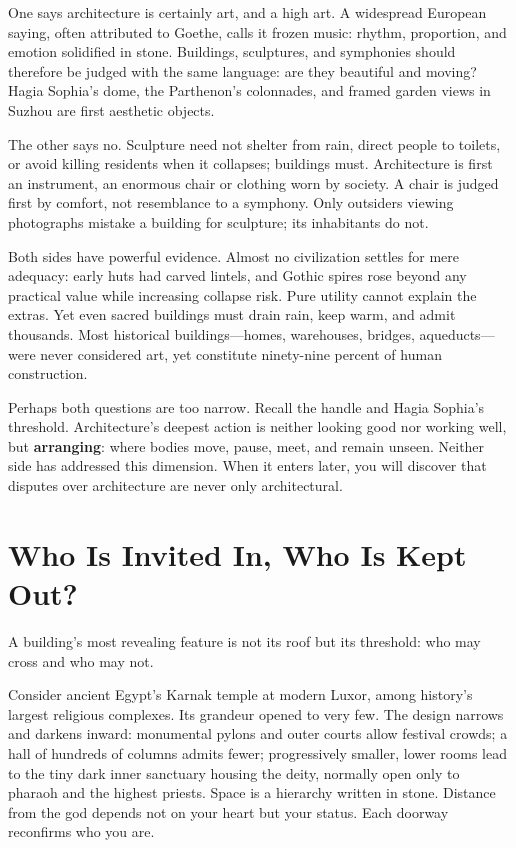 One says architecture is certainly art, and a high art. A widespread European saying, often attributed to Goethe, calls it frozen music: rhythm, proportion, and emotion solidified in stone. Buildings, sculptures, and symphonies should therefore be judged with the same language: are they beautiful and moving? Hagia Sophia's dome, the Parthenon's colonnades, and framed garden views in Suzhou are first aesthetic objects.

The other says no. Sculpture need not shelter from rain, direct people to toilets, or avoid killing residents when it collapses; buildings must. Architecture is first an instrument, an enormous chair or clothing worn by society. A chair is judged first by comfort, not resemblance to a symphony. Only outsiders viewing photographs mistake a building for sculpture; its inhabitants do not.

Both sides have powerful evidence. Almost no civilization settles for mere adequacy: early huts had carved lintels, and Gothic spires rose beyond any practical value while increasing collapse risk. Pure utility cannot explain the extras. Yet even sacred buildings must drain rain, keep warm, and admit thousands. Most historical buildings---homes, warehouses, bridges, aqueducts---were never considered art, yet constitute ninety-nine percent of human construction.

Perhaps both questions are too narrow. Recall the handle and Hagia Sophia's threshold. Architecture's deepest action is neither looking good nor working well, but \textbf{arranging}: where bodies move, pause, meet, and remain unseen. Neither side has addressed this dimension. When it enters later, you will discover that disputes over architecture are never only architectural.

\section{Who Is Invited In, Who Is Kept Out?}
A building's most revealing feature is not its roof but its threshold: who may cross and who may not.

Consider ancient Egypt's Karnak temple at modern Luxor, among history's largest religious complexes. Its grandeur opened to very few. The design narrows and darkens inward: monumental pylons and outer courts allow festival crowds; a hall of hundreds of columns admits fewer; progressively smaller, lower rooms lead to the tiny dark inner sanctuary housing the deity, normally open only to pharaoh and the highest priests. Space is a hierarchy written in stone. Distance from the god depends not on your heart but your status. Each doorway reconfirms who you are.

